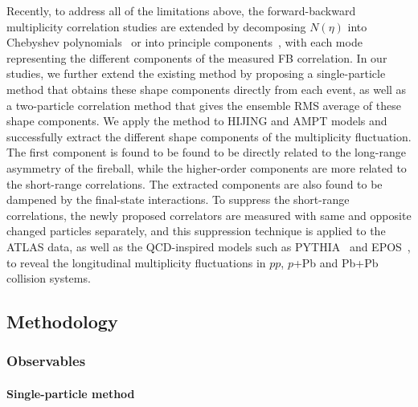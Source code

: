 Recently, to address all of the limitations above, the forward-backward multiplicity correlation studies are extended by decomposing $N(\eta)$ into Chebyshev polynomials~\cite{Bzdak:2012tp} or into principle components~\cite{Bhalerao:2014mua}, with each mode representing the different components of the measured FB correlation. In our studies, we further extend the existing method by proposing a single-particle method that obtains these shape components directly from each event, as well as a two-particle correlation method that gives the ensemble RMS average of these shape components. We apply the method to HIJING and AMPT models and successfully extract the different shape components of the multiplicity fluctuation. The first component is found to be found to be directly related to the long-range asymmetry of the fireball, while the higher-order components are more related to the short-range correlations. The extracted components are also found to be dampened by the final-state interactions. To suppress the short-range correlations, the newly proposed correlators are measured with same and opposite changed particles separately, and this suppression technique is applied to the ATLAS data, as well as the QCD-inspired models such as PYTHIA~\cite{Sjostrand:2007gs} and EPOS~\cite{Pierog:2013ria}, to reveal the longitudinal multiplicity fluctuations in $pp$, $p$+Pb and Pb+Pb collision systems.



\subsection{Methodology}

\subsubsection{Observables}

\paragraph{Single-particle method}

